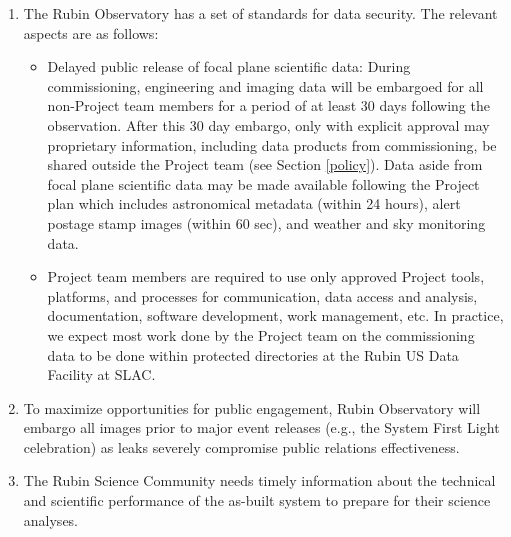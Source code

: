 \documentclass[SE,authoryear,toc,lsstdraft]{lsstdoc}
\begin{document}
\begin{enumerate}

  \item The Rubin Observatory has a set of standards for data security.
  The relevant aspects are as follows:

  \begin{itemize}

    \item Delayed public release of focal plane scientific data:
    During commissioning, engineering and imaging data will be embargoed for all non-Project team members for a period of at least 30 days following the observation.
    After this 30 day embargo, only with explicit approval may proprietary information, including data products from commissioning, be shared outside the Project team (see Section \ref{policy}).
    Data aside from focal plane scientific data may be made available following the Project plan which includes astronomical metadata (within 24 hours), alert postage stamp images (within 60 sec), and weather and sky monitoring data.

    \item Project team members are required to use only approved Project tools, platforms, and processes for communication, data access and analysis, documentation, software development, work management, etc.
    In practice, we expect most work done by the Project team on the commissioning data to be done within protected directories at the Rubin US Data Facility at SLAC.

  \end{itemize}

  \item To maximize opportunities for public engagement, Rubin Observatory will embargo all images prior to major event releases (e.g., the System First Light celebration) as leaks severely compromise public relations effectiveness.

  \item The Rubin Science Community needs timely information about the technical and scientific performance of the as-built system to prepare for their science analyses.


\end{enumerate}
\end{document}
